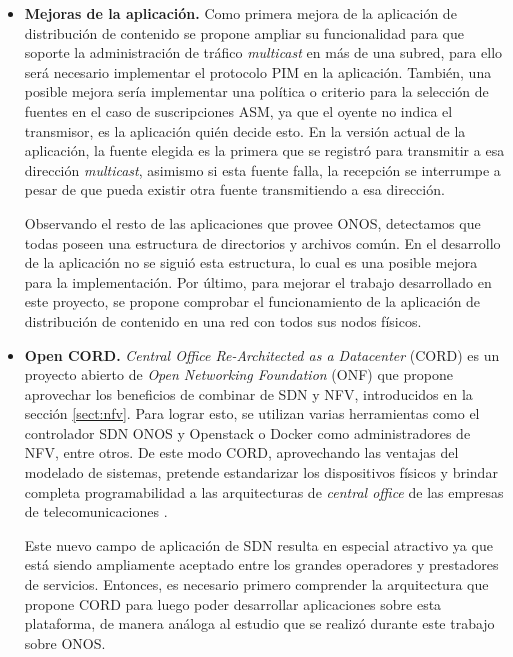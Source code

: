 \begin{itemize}

    \item \textbf{Mejoras de la aplicación.} Como primera mejora de la aplicación de distribución de contenido se propone ampliar su funcionalidad para que soporte la administración de tráfico \textit{multicast} en más de una subred, para ello será necesario implementar el protocolo PIM en la aplicación. También, una posible mejora sería implementar una política o criterio para la selección de fuentes en el caso de suscripciones ASM, ya que el oyente no indica el transmisor, es la aplicación quién decide esto. En la versión actual de la aplicación, la fuente elegida es la primera que se registró para transmitir a esa dirección \textit{multicast}, asimismo si esta fuente falla, la recepción se interrumpe a pesar de que pueda existir otra fuente transmitiendo a esa dirección.

    Observando el resto de las aplicaciones que provee ONOS, detectamos que todas poseen una estructura de directorios y archivos común. En el desarrollo de la aplicación no se siguió esta estructura, lo cual es una posible mejora para la implementación. Por último, para mejorar el trabajo desarrollado en este proyecto, se propone comprobar el funcionamiento de la aplicación de distribución de contenido en una red con todos sus nodos físicos.
    
    \item \textbf{Open CORD.} \textit{Central Office Re-Architected as a Datacenter} (CORD) es un proyecto abierto de \textit{Open Networking Foundation} (ONF) que propone aprovechar los beneficios de combinar de SDN y NFV, introducidos en la sección \ref{sect:nfv}. Para lograr esto, se utilizan varias herramientas como el controlador SDN ONOS y Openstack o Docker como administradores de NFV, entre otros. De este modo CORD, aprovechando las ventajas del modelado de sistemas, pretende estandarizar los dispositivos físicos y brindar completa programabilidad a las arquitecturas de \textit{central office} de las empresas de telecomunicaciones \parencite{cord}.

    Este nuevo campo de aplicación de SDN resulta en especial atractivo ya que está siendo ampliamente aceptado entre los grandes operadores y prestadores de servicios. Entonces, es necesario primero comprender la arquitectura que propone CORD para luego poder desarrollar aplicaciones sobre esta plataforma, de manera análoga al estudio que se realizó durante este trabajo sobre ONOS.
    

\end{itemize}
